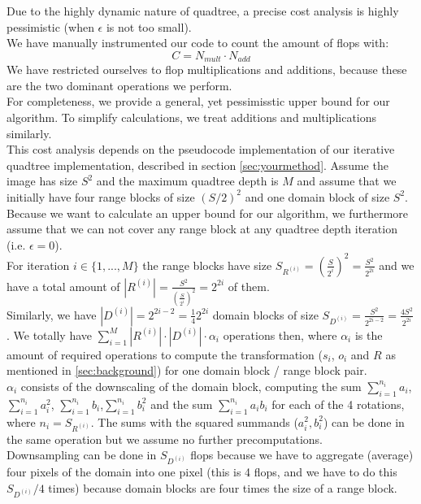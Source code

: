 Due to the highly dynamic nature of quadtree, a precise cost analysis is highly pessimistic (when $\epsilon$ is not too small).\\
We have manually instrumented our code to count the amount of flops with:
$$
C = N_{mult} \cdot N_{add}
$$
We have restricted ourselves to flop multiplications and additions, because these are the two dominant operations we perform.\\
For completeness, we provide a general, yet pessimisstic upper bound for our algorithm. To simplify calculations, we treat additions and multiplications similarly.\\
This cost analysis depends on the pseudocode implementation of our iterative quadtree implementation, described in section \ref{sec:yourmethod}.
Assume the image has size $S^2$ and the maximum quadtree depth is $M$ and assume that we initially have four range blocks of size $(S/2)^2$
and one domain block of size $S^2$. Because we want to calculate an upper bound for our algorithm, we furthermore assume that
we can not cover any range block at any quadtree depth iteration (i.e. $\epsilon = 0$). \\
For iteration $i \in \{1,...,M\}$ the range blocks have size $S_{R^{(i)}} = (\frac{S}{2^i})^2 = \frac{S^2}{2^{2i}}$ 
and we have a total amount of $|R^{(i)}|=\frac{S^2}{(\frac{S}{2^i})^2} = 2^{2i}$ of them.\\
Similarly, we have $|D^{(i)}|=2^{2i-2} = \frac{1}{4} 2^{2i}$ domain blocks of size $S_{D^{(i)}} = \frac{S^2}{2^{2i-2}} = \frac{4S^2}{2^{2i}} $. 
We totally have $\sum_{i=1}^M |R^{(i)}| \cdot |D^{(i)}| \cdot \alpha_i$ operations then, 
where $\alpha_i$ is the amount of required operations to compute the transformation ($s_i$, $o_i$ and $R$ as mentioned in \ref{sec:background}) for one domain block / range block pair.\\
$\alpha_i$ consists of the downscaling of the domain block, computing the sum $\sum_{i=1}^{n_i} a_i$,$\sum_{i=1}^{n_i} a_i^2$, $\sum_{i=1}^{n_i} b_i$,$\sum_{i=1}^{n_i} b_i^2$ and the sum $\sum_{i=1}^{n_i} a_i b_i$ for each of the 4
rotations, where $n_i=S_{R^{(i)}}$. The sums with the squared summands ($a_i^2, b_i^2$) can be done in the same operation but we assume no further precomputations. \\
Downsampling can be done in $S_{D^{(i)}}$ flops because we have to aggregate (average) four pixels of the domain into one pixel (this is 4 flops, and we have to do this $S_{D^{(i)}}/4$ times) because domain blocks are four times the size of a range block. \\

